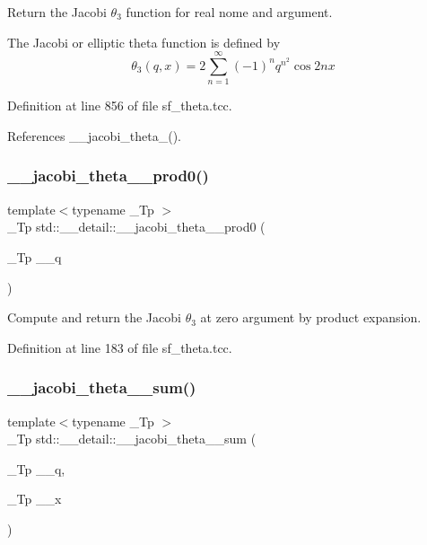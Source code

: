 Return the Jacobi $ \theta_3 $ function for real nome and argument.

The Jacobi or elliptic theta function is defined by \[ \theta_3(q,x) = 2\sum_{n=1}^{\infty}(-1)^n q^{n^2}\cos{2nx} \] 

Definition at line 856 of file sf\+\_\+theta.\+tcc.



References \+\_\+\+\_\+jacobi\+\_\+theta\+\_().

\mbox{\label{namespacestd_1_1____detail_aa9e35fac0b9a6449071343520eab552c}} 
\subsubsection{\texorpdfstring{\+\_\+\+\_\+jacobi\+\_\+theta\+\_\+\_\+prod0()}{\_\_jacobi\_theta\_3\_prod0()}}
{\footnotesize\ttfamily template$<$typename \+\_\+\+Tp $>$ \\
\+\_\+\+Tp std\+::\+\_\+\+\_\+detail\+::\+\_\+\+\_\+jacobi\+\_\+theta\+\_\+\_\+prod0 (\begin{DoxyParamCaption}\item[{\+\_\+\+Tp}]{\+\_\+\+\_\+q }\end{DoxyParamCaption})}

Compute and return the Jacobi $ \theta_3 $ at zero argument by product expansion. 

Definition at line 183 of file sf\+\_\+theta.\+tcc.

\mbox{\label{namespacestd_1_1____detail_a07e080795e7f80c5a0b733d6bac49675}} 
\subsubsection{\texorpdfstring{\+\_\+\+\_\+jacobi\+\_\+theta\+\_\+\_\+sum()}{\_\_jacobi\_theta\_3\_sum()}}
{\footnotesize\ttfamily template$<$typename \+\_\+\+Tp $>$ \\
\+\_\+\+Tp std\+::\+\_\+\+\_\+detail\+::\+\_\+\+\_\+jacobi\+\_\+theta\+\_\+\_\+sum (\begin{DoxyParamCaption}\item[{\+\_\+\+Tp}]{\+\_\+\+\_\+q,  }\item[{\+\_\+\+Tp}]{\+\_\+\+\_\+x }\end{DoxyParamCaption})}

